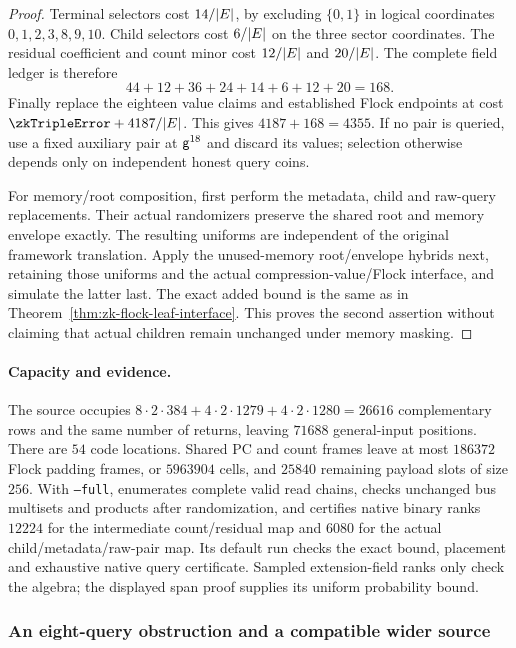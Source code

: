 \begin{proof}
Terminal selectors cost $14/|E|$, by excluding $\{0,1\}$ in logical coordinates $0,1,2,3,8,9,10$. Child selectors cost $6/|E|$ on the three sector coordinates. The residual coefficient and count minor cost $12/|E|$ and $20/|E|$. The complete field ledger is therefore
\[
 44+12+36+24+14+6+12+20=168.
\]
Finally replace the eighteen value claims and established Flock endpoints at cost $\zkTripleError+4187/|\E|$. This gives $4187+168=4355$. If no pair is queried, use a fixed auxiliary pair at $\mathsf{g}^{18}$ and discard its values; selection otherwise depends only on independent honest query coins.

For memory/root composition, first perform the metadata, child and raw-query replacements. Their actual randomizers preserve the shared root and memory envelope exactly. The resulting uniforms are independent of the original framework translation. Apply the unused-memory root/envelope hybrids next, retaining those uniforms and the actual compression-value/Flock interface, and simulate the latter last. The exact added bound is the same as in Theorem~\ref{thm:zk-flock-leaf-interface}. This proves the second assertion without claiming that actual children remain unchanged under memory masking.
\end{proof}

\paragraph{Capacity and evidence.} The source occupies $8\cdot2\cdot384+4\cdot2\cdot1279+4\cdot2\cdot1280=26616$ complementary rows and the same number of returns, leaving $71688$ general-input positions. There are $54$ code locations. Shared PC and count frames leave at most $186372$ Flock padding frames, or $5963904$ cells, and $25840$ remaining payload slots of size $256$. With \texttt{--full},  enumerates complete valid read chains, checks unchanged bus multisets and products after randomization, and certifies native binary ranks $12224$ for the intermediate count/residual map and $6080$ for the actual child/metadata/raw-pair map. Its default run checks the exact bound, placement and exhaustive native query certificate. Sampled extension-field ranks only check the algebra; the displayed span proof supplies its uniform probability bound.

\subsubsection{An eight-query obstruction and a compatible wider source}

